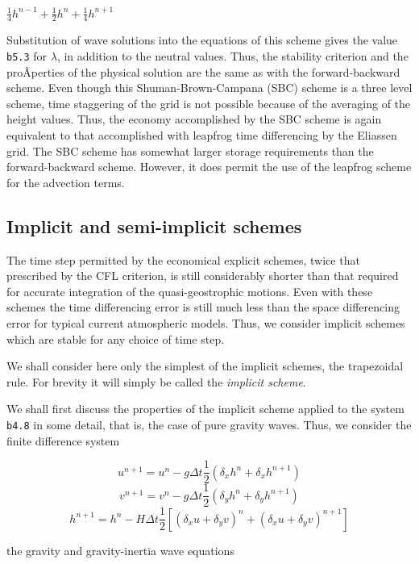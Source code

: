 \(\frac{1}{4}h^{n - 1} + \frac{1}{2}h^{n} + \frac{1}{4}h^{n + 1}\)

Substitution of wave solutions into the equations of this scheme gives
the value \texttt{b5.3} for \(\lambda\), in addition to the neutral
values. Thus, the stability criterion and the proÂ­perties of the
physical solution are the same as with the forward-backward scheme. Even
though this Shuman-Brown-Campana (SBC) scheme is a three level scheme,
time staggering of the grid is not possible because of the averaging of
the height values. Thus, the economy accomplished by the SBC scheme is
again equivalent to that accomplished with leapfrog time differencing by
the Eliassen grid. The SBC scheme has somewhat larger storage
requirements than the forward-backward scheme. However, it does permit
the use of the leapfrog scheme for the advection terms.

\subsection{\texorpdfstring{\textbf{Implicit and semi-implicit
schemes}}{Implicit and semi-implicit schemes}}\label{Section4.6}

The time step permitted by the economical explicit schemes, twice that
prescribed by the CFL criterion, is still considerably shorter than that
required for accurate integration of the quasi-geostrophic motions. Even
with these schemes the time differencing error is still much less than
the space differencing error for typical current atmospheric models.
Thus, we consider implicit schemes which are stable for any choice of
time step.

We shall consider here only the simplest of the implicit schemes, the
trapezoidal rule. For brevity it will simply be called the
\emph{implicit scheme}.

We shall first discuss the properties of the implicit scheme applied to
the system \texttt{b4.8} in some detail, that is, the case of pure
gravity waves. Thus, we consider the finite difference system

{\[u^{n + 1} = u^{n} - g\Delta t\frac{1}{2}\left( \delta_{x}h^{n} + \delta_{x}h^{n + 1} \right)\]\[v^{n + 1} = v^{n} - g\Delta t\frac{1}{2}\left( \delta_{y}h^{n} + \delta_{y}h^{n + 1} \right)\]\[h^{n + 1} = h^{n} - H\Delta t\frac{1}{2}\left[
\left( \delta_x u + \delta_{y}v \right)^{n} + \left( \delta_{x}u + \delta_{y}v \right)^{n + 1} \right]\]}

the gravity and gravity-inertia wave equations


